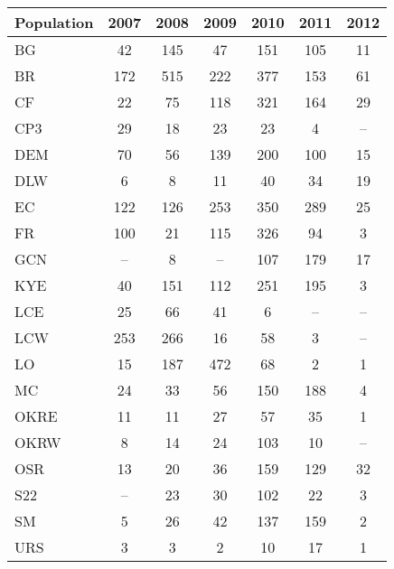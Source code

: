\documentclass[12pt, oneside, titlepage]{article}   	%
\begin{document}
 \label{tab:sigma} 
\begin{table}[ht]
\centering
\begin{tabular}{lcccccc}
  \hline
Population & 2007 & 2008 & 2009 & 2010 & 2011 & 2012 \\ 
  \hline
BG &  42 & 145 &  47 & 151 & 105 &  11 \\ 
  BR & 172 & 515 & 222 & 377 & 153 &  61 \\ 
  CF &  22 &  75 & 118 & 321 & 164 &  29 \\ 
  CP3 &  29 &  18 &  23 &  23 &   4 & -- \\ 
  DEM &  70 &  56 & 139 & 200 & 100 &  15 \\ 
  DLW &   6 &   8 &  11 &  40 &  34 &  19 \\ 
  EC & 122 & 126 & 253 & 350 & 289 &  25 \\ 
  FR & 100 &  21 & 115 & 326 &  94 &   3 \\ 
  GCN & -- &   8 & -- & 107 & 179 &  17 \\ 
  KYE &  40 & 151 & 112 & 251 & 195 &   3 \\ 
  LCE &  25 &  66 &  41 &   6 & -- & -- \\ 
  LCW & 253 & 266 &  16 &  58 &   3 & -- \\ 
  LO &  15 & 187 & 472 &  68 &   2 &   1 \\ 
  MC &  24 &  33 &  56 & 150 & 188 &   4 \\ 
  OKRE &  11 &  11 &  27 &  57 &  35 &   1 \\ 
  OKRW &   8 &  14 &  24 & 103 &  10 & -- \\ 
  OSR &  13 &  20 &  36 & 159 & 129 &  32 \\ 
  S22 & -- &  23 &  30 & 102 &  22 &   3 \\ 
  SM &   5 &  26 &  42 & 137 & 159 &   2 \\ 
  URS &   3 &   3 &   2 &  10 &  17 &   1 \\ 
   \hline
\end{tabular}
\end{table}

 \newpage
 
 
\end{document}
